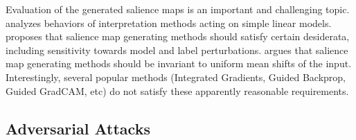 Evaluation of the generated salience maps is an important and challenging topic. \cite{kindermans2017learning} analyzes behaviors of interpretation methods acting on simple linear models. \cite{sanity_checks_salience_maps} proposes that salience map generating methods should satisfy certain desiderata, including sensitivity towards model and label perturbations. \cite{unreliability} argues that salience map generating methods should be invariant to uniform mean shifts of the input. Interestingly, several popular methods (Integrated Gradients, Guided Backprop, Guided GradCAM, etc) do not satisfy these apparently reasonable requirements.


\subsection{Adversarial Attacks} \label{subsec:adv_attack_defense}

